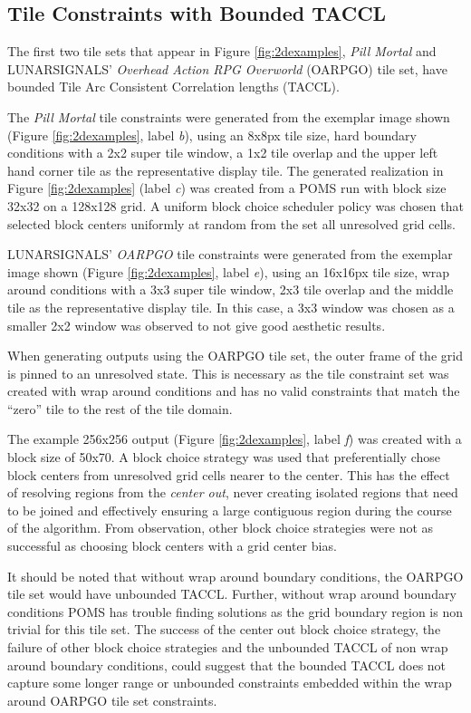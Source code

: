 \subsection{Tile Constraints with Bounded TACCL}

The first two tile sets that appear in Figure \ref{fig:2dexamples}, \textit{Pill Mortal} and LUNARSIGNALS' \textit{Overhead Action RPG Overworld}
(OARPGO) tile set,
have bounded Tile Arc Consistent Correlation lengths (TACCL).

The \textit{Pill Mortal} tile constraints were generated from the exemplar image shown (Figure \ref{fig:2dexamples}, label \textit{b}), using
an 8x8px tile size, hard boundary conditions with a 2x2 super tile window, a 1x2 tile overlap and the upper left hand corner tile as the representative
display tile.
The generated realization in Figure \ref{fig:2dexamples} (label \textit{c}) was created from a POMS run with block size 32x32 on a 128x128 grid.
A uniform block choice scheduler policy was chosen that selected block centers uniformly at random from the set all unresolved grid cells.

LUNARSIGNALS' \textit{OARPGO} tile constraints were generated from the exemplar image shown (Figure \ref{fig:2dexamples}, label \textit{e}), using
an 16x16px tile size, wrap around conditions with a 3x3 super tile window, 2x3 tile overlap and the middle tile as the representative
display tile.
In this case, a 3x3 window was chosen as a smaller 2x2 window was observed to not give good aesthetic results.

When generating outputs using the OARPGO tile set, the outer frame of the grid is pinned to an unresolved state.
This is necessary as the tile constraint set was created with wrap around conditions and has no valid constraints that match the ``zero'' tile
to the rest of the tile domain.

The example 256x256 output (Figure \ref{fig:2dexamples}, label \textit{f})
was created with a block size of 50x70.
A block choice strategy was used that preferentially chose block centers from unresolved grid cells
nearer to the center.
This has the effect of resolving regions from the \textit{center out}, never creating isolated regions that need to be joined and effectively
  ensuring a large contiguous region during the course of the algorithm.
From observation, other block choice strategies were not as successful as choosing block centers with a grid center bias.

It should be noted that without wrap around boundary conditions, the OARPGO tile set would have unbounded TACCL.
Further, without wrap around boundary conditions POMS has trouble finding solutions as the
grid boundary region is non trivial for this tile set.
The success of the center out block choice strategy, the failure of other block choice strategies and the unbounded TACCL of
non wrap around boundary conditions, could suggest that the bounded TACCL does not capture some longer range or unbounded constraints
  embedded within the wrap around OARPGO tile set constraints.

